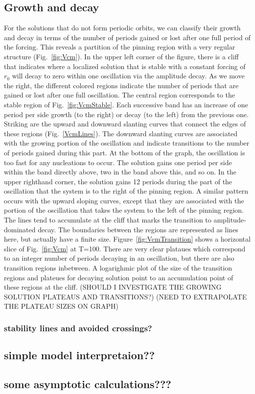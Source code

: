 \documentclass[../main/TimeForcingSHE.tex]{subfiles}
\begin{document}
\subsection{Growth and decay}
For the solutions that do not form periodic orbits, we can classify their growth and decay in terms of the number of periods gained or lost after one full period of the forcing.  This reveals a partition of the pinning region with a very regular structure (Fig.~\ref{fig:Vcm}).  In the upper left corner of the figure, there is a cliff that indicates where a localized solution that is stable with a constant forcing of $r_0$ will decay to zero within one oscillation via the amplitude decay.  As we move the right, the different colored regions indicate the number of periods that are gained or lost after one full oscillation.
\FIGvcm
 The central region corresponds to the stable region of Fig.~\ref{fig:VcmStable}.  Each successive band has an increase of one period per side growth (to the right) or decay (to the left) from the previous one.  Striking are the upward and downward slanting curves that connect the edges of these regions (Fig.~\ref{VcmLines}).  The downward slanting curves are associated with the growing portion of the oscillation and indicate transitions to the number of periods gained during this part.  At the bottom of the graph, the oscillation is too fast for any nucleations to occur.  The solution gains one period per side within the band directly above, two in the band above this, and so on.  In the upper righthand corner, the solution gains 12 periods during the part of the oscillation that the system is to the right of the pinning region.  A similar pattern occurs with the upward sloping curves, except that they are associated with the portion of the oscillation that takes the system to the left of the pinning region.  The lines tend to accumulate at the cliff that marks the transition to amplitude-dominated decay.
\FIGvcmlines
The boundaries between the regions are represented as lines here, but actually have a finite size.  Figure~\ref{fig:VcmTransition} shows a horizontal slice of Fig.~\ref{fig:Vcm} at T=100.  There are very clear plataues which correspond to an integer number of periods decaying in an oscillation, but there are also transition regions inbetween.  A logarighmic plot of the size of the transition regions and plateues for decaying solution point to an accumulation point of these regions at the cliff. (SHOULD I INVESTIGATE THE GROWING SOLUTION PLATEAUS AND TRANSITIONS?)   
(NEED TO EXTRAPOLATE THE PLATEAU SIZES ON GRAPH)
\FIGvcmtransition

\subsubsection{stability lines and avoided crossings?}
\subsection{simple model interpretaion??}
\subsection{some asymptotic calculations???}
\end{document}

